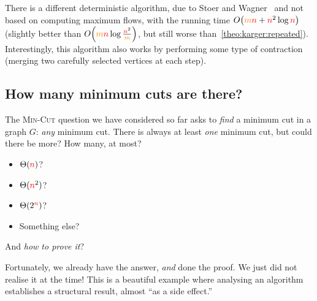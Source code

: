 \begin{remark}
    There is a different deterministic algorithm, due to Stoer and Wagner~\cite{StoerW97} and not based on computing maximum flows, with the running time $\bigO{\orange{m}\red{n}+\red{n}^2\log\red{n}}$ (slightly better than $\bigO{\orange{m}\red{n}\log\frac{\red{n}^2}{\orange{m}}}$, but still worse than~\cref{theo:karger:repeated}). Interestingly, this algorithm also works by performing some type of contraction (merging two carefully selected vertices at each step).
\end{remark}

\subsection{How many minimum cuts are there?}
The \textsc{Min-Cut} question we have considered so far asks to \emph{find} a minimum cut in a graph $G$: \emph{any} minimum cut. There is always at least \emph{one} minimum cut, but could there be more? How many, at most?
\begin{itemize}
    \item $\Theta({\textcolor{red}{n}})$?
    \item $\Theta({\textcolor{red}{n}}^2)$?
    \item $\Theta(2^{{\textcolor{red}{n}}})$?
    \item Something else?
\end{itemize}
And \emph{how to prove it}?\medskip

Fortunately, we already have the answer, \emph{and} done the proof. We just did not realise it at the time! This is a beautiful example where analysing an algorithm establishes a structural result, almost ``as a side effect.''

